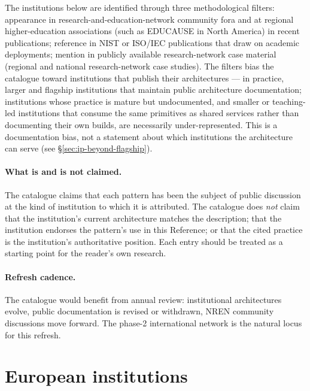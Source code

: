 The institutions below are identified through three methodological
filters: appearance in research-and-education-network community
fora and at regional higher-education associations (such as EDUCAUSE
in North America) in recent publications; reference in NIST or ISO/IEC publications
that draw on academic deployments;
mention in publicly available research-network case material
(regional and national research-network case studies). The filters
bias the catalogue toward institutions that
publish their architectures --- in practice, larger and flagship
institutions that maintain public architecture documentation;
institutions whose practice is mature but undocumented, and smaller or
teaching-led institutions that consume the same primitives as shared
services rather than documenting their own builds, are necessarily
under-represented. This is a documentation bias, not a statement about
which institutions the architecture can serve (see
\S\ref{sec:ip-beyond-flagship}).

\paragraph{What is and is not claimed.} The catalogue claims that
each pattern has been the subject of public discussion at the kind
of institution to which it is attributed. The catalogue does \emph{not} claim
that the institution's current architecture matches the description;
that the institution endorses the pattern's use in this Reference;
or that the cited practice is the institution's authoritative
position. Each entry should be treated as a starting point for the
reader's own research.

\paragraph{Refresh cadence.} The catalogue would benefit from
annual review: institutional architectures evolve, public
documentation is revised or withdrawn, NREN community discussions
move forward. The phase-2 international network is the natural
locus for this refresh.

\section{European institutions}
\label{sec:ip-europe}

